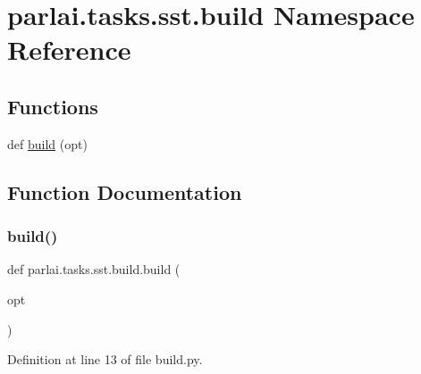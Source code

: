 \hypertarget{namespaceparlai_1_1tasks_1_1sst_1_1build}{}\section{parlai.\+tasks.\+sst.\+build Namespace Reference}
\label{namespaceparlai_1_1tasks_1_1sst_1_1build}
\subsection*{Functions}
\begin{DoxyCompactItemize}
\item 
def \hyperlink{namespaceparlai_1_1tasks_1_1sst_1_1build_af9e8461053fb439f9cf6e16c10bd6f63}{build} (opt)
\end{DoxyCompactItemize}


\subsection{Function Documentation}
\mbox{\label{namespaceparlai_1_1tasks_1_1sst_1_1build_af9e8461053fb439f9cf6e16c10bd6f63}} 
\subsubsection{\texorpdfstring{build()}{build()}}
{\footnotesize\ttfamily def parlai.\+tasks.\+sst.\+build.\+build (\begin{DoxyParamCaption}\item[{}]{opt }\end{DoxyParamCaption})}



Definition at line 13 of file build.\+py.

